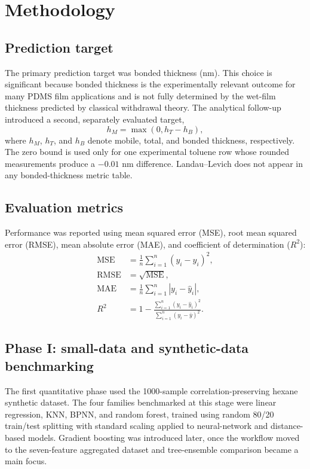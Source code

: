 \documentclass[11pt]{article}
\begin{document}
\section{Methodology}

\subsection{Prediction target}
The primary prediction target was bonded thickness (nm). This choice is significant because bonded thickness is the experimentally relevant outcome for many PDMS film applications and is not fully determined by the wet-film thickness predicted by classical withdrawal theory. The analytical follow-up introduced a second, separately evaluated target,
\begin{equation}
h_M = \max\left(0,h_T-h_B\right),
\end{equation}
where $h_M$, $h_T$, and $h_B$ denote mobile, total, and bonded thickness, respectively. The zero bound is used only for one experimental toluene row whose rounded measurements produce a $-0.01$ nm difference. Landau--Levich does not appear in any bonded-thickness metric table.

\subsection{Evaluation metrics}
Performance was reported using mean squared error (MSE), root mean squared error (RMSE), mean absolute error (MAE), and coefficient of determination ($R^2$):
\begin{align}
\mathrm{MSE} &= \frac{1}{n}\sum_{i=1}^{n}(y_i-\hat{y}_i)^2, \\
\mathrm{RMSE} &= \sqrt{\mathrm{MSE}}, \\
\mathrm{MAE} &= \frac{1}{n}\sum_{i=1}^{n}|y_i-\hat{y}_i|, \\
R^2 &= 1 - \frac{\sum_{i=1}^{n}(y_i-\hat{y}_i)^2}{\sum_{i=1}^{n}(y_i-\bar{y})^2}.
\end{align}

\subsection{Phase I: small-data and synthetic-data benchmarking}
The first quantitative phase used the 1000-sample correlation-preserving hexane synthetic dataset. The four families benchmarked at this stage were linear regression, KNN, BPNN, and random forest, trained using random 80/20 train/test splitting with standard scaling applied to neural-network and distance-based models. Gradient boosting was introduced later, once the workflow moved to the seven-feature aggregated dataset and tree-ensemble comparison became a main focus.
\end{document}
